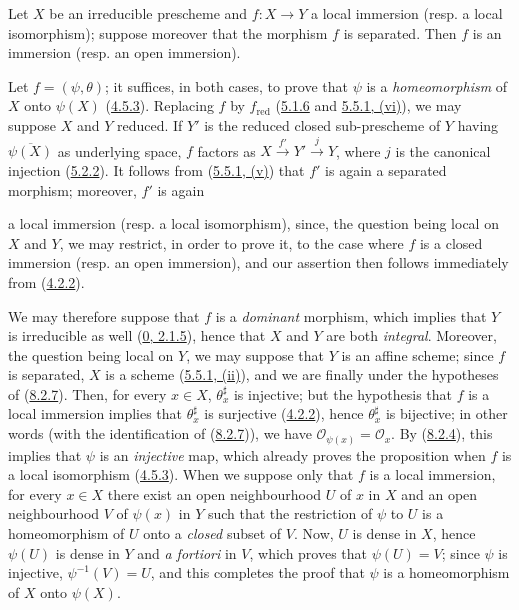 \begin{proposition}[8.2.8]
\label{I.8.2.8}
Let $X$ be an irreducible prescheme and $f:X\to Y$ a local immersion
(resp. a local isomorphism); suppose moreover that the morphism $f$ is
separated. Then $f$ is an immersion (resp. an open immersion).
\end{proposition}

Let $f=(\psi,\theta)$; it suffices, in both cases, to prove that $\psi$
is a \emph{homeomorphism} of $X$ onto $\psi(X)$
(\hyperref[I.4.5.3]{4.5.3}). Replacing $f$ by $f_{\mathrm{red}}$
(\hyperref[I.5.1.6]{5.1.6} and
\hyperref[I.5.5.1]{5.5.1, (vi)}), we may suppose $X$ and $Y$ reduced. If
$Y'$ is the reduced closed sub-prescheme of $Y$ having
$\overline{\psi(X)}$ as underlying space, $f$ factors as
$X\xrightarrow{f'}Y'\xrightarrow{j}Y$, where $j$ is the canonical injection
(\hyperref[I.5.2.2]{5.2.2}). It follows from
(\hyperref[I.5.5.1]{5.5.1, (v)}) that $f'$ is again a separated morphism;
moreover, $f'$ is again

a local immersion (resp. a local isomorphism), since, the question being
local on $X$ and $Y$, we may restrict, in order to prove it, to the case where
$f$ is a closed immersion (resp. an open immersion), and our assertion then
follows immediately from (\hyperref[I.4.2.2]{4.2.2}).

We may therefore suppose that $f$ is a \emph{dominant} morphism, which
implies that $Y$ is irreducible as well
(\hyperref[0.2.1.5]{0, 2.1.5}), hence that $X$ and $Y$ are both
\emph{integral}. Moreover, the question being local on $Y$, we may suppose
that $Y$ is an affine scheme; since $f$ is separated, $X$ is a scheme
(\hyperref[I.5.5.1]{5.5.1, (ii)}), and we are finally under the
hypotheses of (\hyperref[I.8.2.7]{8.2.7}). Then, for every $x\in X$,
$\theta_x^\sharp$ is injective; but the hypothesis that $f$ is a local
immersion implies that $\theta_x^\sharp$ is surjective
(\hyperref[I.4.2.2]{4.2.2}), hence $\theta_x^\sharp$ is bijective;
in other words (with the identification of
(\hyperref[I.8.2.7]{8.2.7})), we have
$\mathscr{O}_{\psi(x)}=\mathscr{O}_x$. By
(\hyperref[I.8.2.4]{8.2.4}), this implies that $\psi$ is an
\emph{injective} map, which already proves the proposition when $f$ is a
local isomorphism (\hyperref[I.4.5.3]{4.5.3}). When we suppose only
that $f$ is a local immersion, for every $x\in X$ there exist an open
neighbourhood $U$ of $x$ in $X$ and an open neighbourhood $V$ of $\psi(x)$ in
$Y$ such that the restriction of $\psi$ to $U$ is a homeomorphism of $U$ onto
a \emph{closed} subset of $V$. Now, $U$ is dense in $X$, hence $\psi(U)$ is
dense in $Y$ and \emph{a fortiori} in $V$, which proves that
$\psi(U)=V$; since $\psi$ is injective, $\psi^{-1}(V)=U$, and this completes
the proof that $\psi$ is a homeomorphism of $X$ onto $\psi(X)$.

